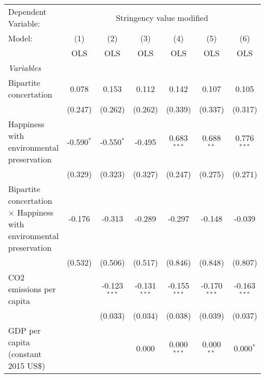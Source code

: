 
\begingroup
\centering
\begin{tabular}{lcccccc}
   \toprule
   Dependent Variable: & \multicolumn{6}{c}{Stringency value modified}\\
   Model:                                                                     & (1)          & (2)            & (3)            & (4)            & (5)            & (6)\\  
                                                                              &  OLS         & OLS            & OLS            & OLS            & OLS            & OLS\\  
   \midrule
   \emph{Variables}\\
   Bipartite concertation                                                     & 0.078        & 0.153          & 0.112          & 0.142          & 0.107          & 0.105\\   
                                                                              & (0.247)      & (0.262)        & (0.262)        & (0.339)        & (0.337)        & (0.317)\\   
   Happiness with environmental preservation                                  & -0.590$^{*}$ & -0.550$^{*}$   & -0.495         & 0.683$^{***}$  & 0.688$^{**}$   & 0.776$^{***}$\\   
                                                                              & (0.329)      & (0.323)        & (0.327)        & (0.247)        & (0.275)        & (0.271)\\   
   Bipartite concertation $\times$ Happiness with environmental preservation  & -0.176       & -0.313         & -0.289         & -0.297         & -0.148         & -0.039\\   
                                                                              & (0.532)      & (0.506)        & (0.517)        & (0.846)        & (0.848)        & (0.807)\\   
   CO2 emissions per capita                                                   &              & -0.123$^{***}$ & -0.131$^{***}$ & -0.155$^{***}$ & -0.170$^{***}$ & -0.163$^{***}$\\   
                                                                              &              & (0.033)        & (0.034)        & (0.038)        & (0.039)        & (0.037)\\   
   GDP per capita (constant 2015 US\$)                                        &              &                & 0.000          & 0.000$^{***}$  & 0.000$^{**}$   & 0.000$^{*}$\\   

\end{tabular}
